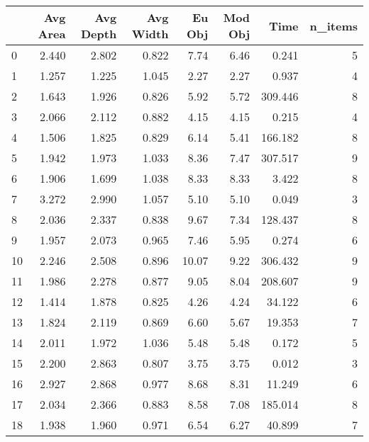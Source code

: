 \begin{tabular}{lrrrrrrr}
\toprule
{} &  Avg Area &  Avg Depth &  Avg Width &  Eu Obj &  Mod Obj &     Time &  n\_items \\
\midrule
0  &     2.440 &      2.802 &      0.822 &    7.74 &     6.46 &    0.241 &        5 \\
1  &     1.257 &      1.225 &      1.045 &    2.27 &     2.27 &    0.937 &        4 \\
2  &     1.643 &      1.926 &      0.826 &    5.92 &     5.72 &  309.446 &        8 \\
3  &     2.066 &      2.112 &      0.882 &    4.15 &     4.15 &    0.215 &        4 \\
4  &     1.506 &      1.825 &      0.829 &    6.14 &     5.41 &  166.182 &        8 \\
5  &     1.942 &      1.973 &      1.033 &    8.36 &     7.47 &  307.517 &        9 \\
6  &     1.906 &      1.699 &      1.038 &    8.33 &     8.33 &    3.422 &        8 \\
7  &     3.272 &      2.990 &      1.057 &    5.10 &     5.10 &    0.049 &        3 \\
8  &     2.036 &      2.337 &      0.838 &    9.67 &     7.34 &  128.437 &        8 \\
9  &     1.957 &      2.073 &      0.965 &    7.46 &     5.95 &    0.274 &        6 \\
10 &     2.246 &      2.508 &      0.896 &   10.07 &     9.22 &  306.432 &        9 \\
11 &     1.986 &      2.278 &      0.877 &    9.05 &     8.04 &  208.607 &        9 \\
12 &     1.414 &      1.878 &      0.825 &    4.26 &     4.24 &   34.122 &        6 \\
13 &     1.824 &      2.119 &      0.869 &    6.60 &     5.67 &   19.353 &        7 \\
14 &     2.011 &      1.972 &      1.036 &    5.48 &     5.48 &    0.172 &        5 \\
15 &     2.200 &      2.863 &      0.807 &    3.75 &     3.75 &    0.012 &        3 \\
16 &     2.927 &      2.868 &      0.977 &    8.68 &     8.31 &   11.249 &        6 \\
17 &     2.034 &      2.366 &      0.883 &    8.58 &     7.08 &  185.014 &        8 \\
18 &     1.938 &      1.960 &      0.971 &    6.54 &     6.27 &   40.899 &        7 \\

\end{tabular}
